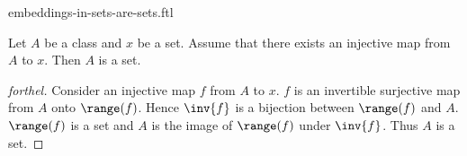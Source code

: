 \documentclass{stex}
\begin{document}
\begin{smodule}{embeddings-in-sets-are-sets.ftl}


\begin{proposition}[forthel,id=EmbeddingsInSetsAreSetsProp]
  Let $A$ be a class and $x$ be a set.
  Assume that there exists an injective map from $A$ to $x$.
  Then $A$ is a set.
\end{proposition}
\begin{proof}[forthel]
  Consider an injective map $f$ from $A$ to $x$.
  $f$ is an invertible surjective map from $A$ onto $\range(f)$.
  Hence $\inv{f}$ is a bijection between $\range(f)$ and $A$.
  $\range(f)$ is a set and $A$ is the image of $\range(f)$ under $\inv{f}$.
  Thus $A$ is a set.
\end{proof}

\end{smodule}
\end{document}
